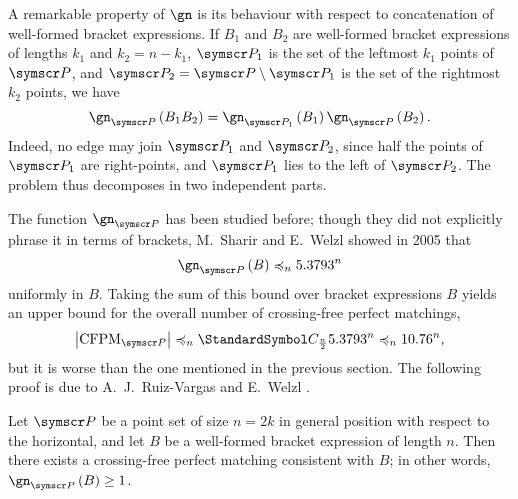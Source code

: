 A remarkable property of $\gn$ is its behaviour with respect to concatenation of well-formed bracket expressions.
If $B_1$ and $B_2$ are well-formed bracket expressions of lengths $k_1$ and $k_2=n-k_1$,
$\pointset P_1$ is the set of the leftmost $k_1$ points of $\pointset P$, and
$\pointset P_2=\pointset P\setminus\pointset P_1$ is the set of the
rightmost $k_2$ points, we have\[
\gn_{\pointset P}\of{B_1B_2}=\gn_{\pointset P_1}\of{B_1}\gn_{\pointset P}\of{B_2}\text.
\]
Indeed, no edge may join $\pointset P_1$ and $\pointset P_2$, since half the points of $\pointset P_1$ are right-points,
and $\pointset P_1$ lies to the left of $\pointset P_2$. The problem thus decomposes in two independent parts.

The function $\gn_{\pointset P}$ has been studied before; though they did not explicitly phrase it in terms of brackets,
M.~Sharir and E.~Welzl showed in 2005 \cite{SharirWelzl2006} that\[
\gn_{\pointset P}\of B\preccurlyeq_n5.3793^n
\]
uniformly in $B$. Taking the sum of this bound over bracket expressions $B$ yields an upper bound for the overall number of
crossing-free perfect matchings,\[
\Cardinality{\CFPM_{\pointset P}}
\preccurlyeq_n \CatalanNumber {\frac n 2} 5.3793^n
\preccurlyeq_n 10.76^n\text,
\]
but it is worse than the one mentioned in the previous section.
\label{boundOnLeftRightPerfectMatchings}
The following proof is due to A.~J.~Ruiz-Vargas and E.~Welzl \cite{RuizVargasWelzl2016}.
\begin{theorem}
Let $\pointset P$ be a point set of size $n = 2k$ in general position with respect to the horizontal,
and let $B$ be a well-formed bracket expression of length $n$.
Then there exists a crossing-free perfect matching consistent with $B$; in other words,
$\gn_{\pointset P}\of B \geq 1$.
\end{theorem}
